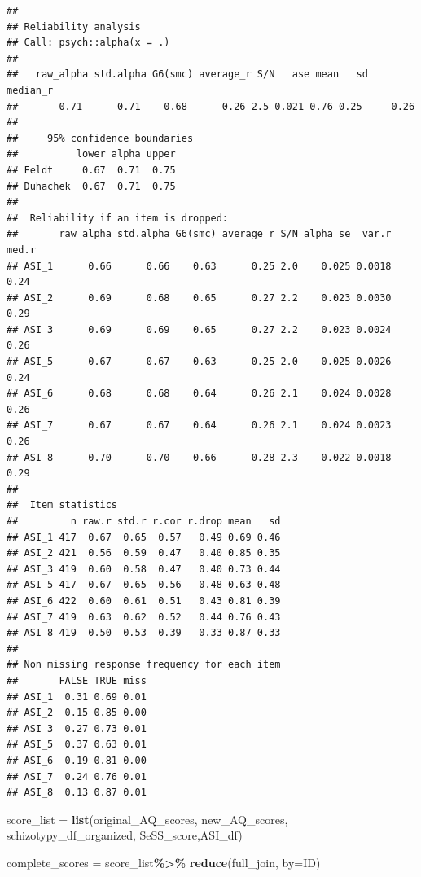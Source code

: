 \documentclass[
]{article}
\newenvironment{Shaded}{\begin{snugshade}}{\end{snugshade}}
\newcommand{\AttributeTok}[1]{\textcolor[rgb]{0.13,0.29,0.53}{#1}}
\newcommand{\FunctionTok}[1]{\textcolor[rgb]{0.13,0.29,0.53}{\textbf{#1}}}
\newcommand{\NormalTok}[1]{#1}
\newcommand{\OtherTok}[1]{\textcolor[rgb]{0.56,0.35,0.01}{#1}}
\newcommand{\SpecialCharTok}[1]{\textcolor[rgb]{0.81,0.36,0.00}{\textbf{#1}}}
\newcommand{\StringTok}[1]{\textcolor[rgb]{0.31,0.60,0.02}{#1}}
\begin{document}
\begin{verbatim}
## 
## Reliability analysis   
## Call: psych::alpha(x = .)
## 
##   raw_alpha std.alpha G6(smc) average_r S/N   ase mean   sd median_r
##       0.71      0.71    0.68      0.26 2.5 0.021 0.76 0.25     0.26
## 
##     95% confidence boundaries 
##          lower alpha upper
## Feldt     0.67  0.71  0.75
## Duhachek  0.67  0.71  0.75
## 
##  Reliability if an item is dropped:
##       raw_alpha std.alpha G6(smc) average_r S/N alpha se  var.r med.r
## ASI_1      0.66      0.66    0.63      0.25 2.0    0.025 0.0018  0.24
## ASI_2      0.69      0.68    0.65      0.27 2.2    0.023 0.0030  0.29
## ASI_3      0.69      0.69    0.65      0.27 2.2    0.023 0.0024  0.26
## ASI_5      0.67      0.67    0.63      0.25 2.0    0.025 0.0026  0.24
## ASI_6      0.68      0.68    0.64      0.26 2.1    0.024 0.0028  0.26
## ASI_7      0.67      0.67    0.64      0.26 2.1    0.024 0.0023  0.26
## ASI_8      0.70      0.70    0.66      0.28 2.3    0.022 0.0018  0.29
## 
##  Item statistics 
##         n raw.r std.r r.cor r.drop mean   sd
## ASI_1 417  0.67  0.65  0.57   0.49 0.69 0.46
## ASI_2 421  0.56  0.59  0.47   0.40 0.85 0.35
## ASI_3 419  0.60  0.58  0.47   0.40 0.73 0.44
## ASI_5 417  0.67  0.65  0.56   0.48 0.63 0.48
## ASI_6 422  0.60  0.61  0.51   0.43 0.81 0.39
## ASI_7 419  0.63  0.62  0.52   0.44 0.76 0.43
## ASI_8 419  0.50  0.53  0.39   0.33 0.87 0.33
## 
## Non missing response frequency for each item
##       FALSE TRUE miss
## ASI_1  0.31 0.69 0.01
## ASI_2  0.15 0.85 0.00
## ASI_3  0.27 0.73 0.01
## ASI_5  0.37 0.63 0.01
## ASI_6  0.19 0.81 0.00
## ASI_7  0.24 0.76 0.01
## ASI_8  0.13 0.87 0.01
\end{verbatim}

\begin{Shaded}
\begin{Highlighting}[]
\NormalTok{score\_list }\OtherTok{=} \FunctionTok{list}\NormalTok{(original\_AQ\_scores, new\_AQ\_scores, schizotypy\_df\_organized, SeSS\_score,ASI\_df)}


\NormalTok{complete\_scores }\OtherTok{=}\NormalTok{ score\_list}\SpecialCharTok{\%\textgreater{}\%} \FunctionTok{reduce}\NormalTok{(full\_join, }\AttributeTok{by=}\StringTok{\textquotesingle{}ID\textquotesingle{}}\NormalTok{)}
\end{Highlighting}
\end{Shaded}
\end{document}
